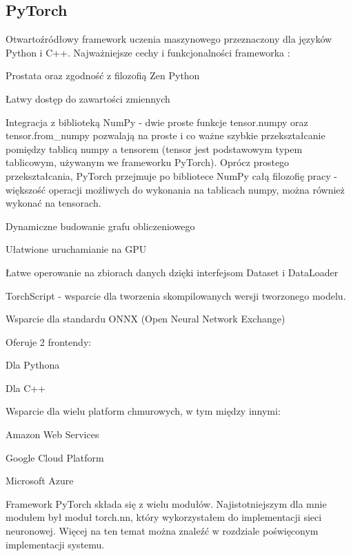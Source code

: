 \subsection{PyTorch}
Otwartoźródłowy framework uczenia maszynowego przeznaczony dla języków Python i C++.
Najważniejsze cechy i funkcjonalności frameworka \cite{pytorch:features}\cite{pytorch:vs:tensorflow}:
\begin{enumerate*}
\item Prostata oraz zgodność z filozofią Zen Python \cite{python:zen}
\item Łatwy dostęp do zawartości zmiennych
\item Integracja z biblioteką NumPy - dwie proste funkcje tensor.numpy oraz tensor.from\_numpy pozwalają na proste i co ważne szybkie przekształcanie pomiędzy tablicą numpy a tensorem (tensor jest podstawowym typem tablicowym, używanym we frameworku PyTorch). Oprócz prostego przekształcania, PyTorch przejmuje po bibliotece NumPy całą filozofię pracy - większość operacji możliwych do wykonania na tablicach numpy, można również wykonać na tensorach.
\item Dynamiczne budowanie grafu obliczeniowego \cite{pytorch:understandingGraphs}
\item Ułatwione uruchamianie na GPU
\item Łatwe operowanie na zbiorach danych dzięki interfejsom Dataset i DataLoader
\item TorchScript - wsparcie dla tworzenia skompilowanych wersji tworzonego modelu.
\item Wsparcie dla standardu ONNX (Open Neural Network Exchange)
\item Oferuje 2 frontendy:
\begin{itemize*}
\item Dla Pythona
\item Dla C++
\end{itemize*}
\item Wsparcie dla wielu platform chmurowych, w tym między innymi:
\begin{itemize*}
\item Amazon Web Services
\item Google Cloud Platform
\item Microsoft Azure
\end{itemize*}
\end{enumerate*}
Framework PyTorch składa się z wielu modułów. Najistotniejszym dla mnie modułem był moduł torch.nn, który wykorzystałem do implementacji sieci neuronowej. Więcej na ten temat można znaleźć w rozdziale poświęconym implementacji systemu.

